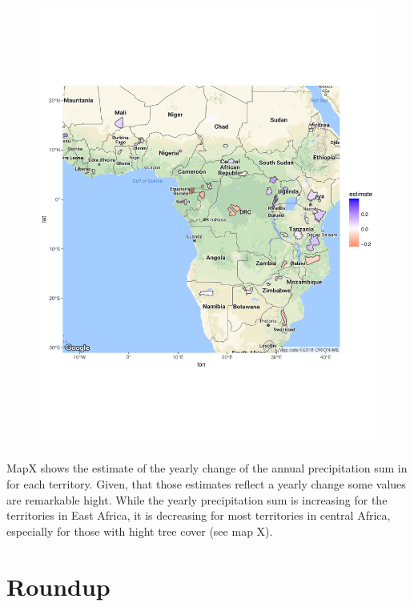 \begin{center}
	\begin{figure}[h]
		\begin{center}
			\includegraphics[width=15cm]{images/sample_session_3_change_map.pdf}
		\end{center}
	\end{figure}
\end{center}


MapX shows the estimate of the yearly change of the annual precipitation sum in for each territory. Given, that those estimates reflect a yearly change some values are remarkable hight. While the yearly precipitation sum is increasing for the territories in East Africa, it is decreasing for most territories in central Africa, especially for those with hight tree cover (see map X).

\section{Roundup}

